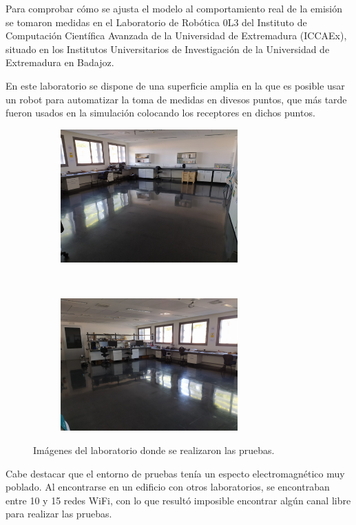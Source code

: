 Para comprobar cómo se ajusta el modelo al comportamiento real de la emisión se tomaron medidas en el Laboratorio de Robótica 0L3 del Instituto de Computación Científica Avanzada de la Universidad de Extremadura (ICCAEx), situado en los Institutos Universitarios de Investigación de la Universidad de Extremadura en Badajoz.

En este laboratorio se dispone de una superficie amplia en la que es posible usar un robot para automatizar la toma de medidas en divesos puntos, que más tarde fueron usados en la simulación colocando los receptores en dichos puntos.

\begin{figure}[H]
    \centering
    \begin{subfigure}[b]{0.45\textwidth}
        \centering
        \includegraphics[width=6.8cm]{pic/lab1.jpg}
    \end{subfigure}
    ~~
    \begin{subfigure}[b]{0.45\textwidth}
        \centering
        \includegraphics[width=6.8cm]{pic/lab2.jpg}
    \end{subfigure}
    \caption{Imágenes del laboratorio donde se realizaron las pruebas.}
    \label{fig:lab_pics}
\end{figure}


Cabe destacar que el entorno de pruebas tenía un especto electromagnético muy poblado.
Al encontrarse en un edificio con otros laboratorios, se encontraban entre 10 y 15 redes WiFi, con lo que resultó imposible encontrar algún canal libre para realizar las pruebas.

